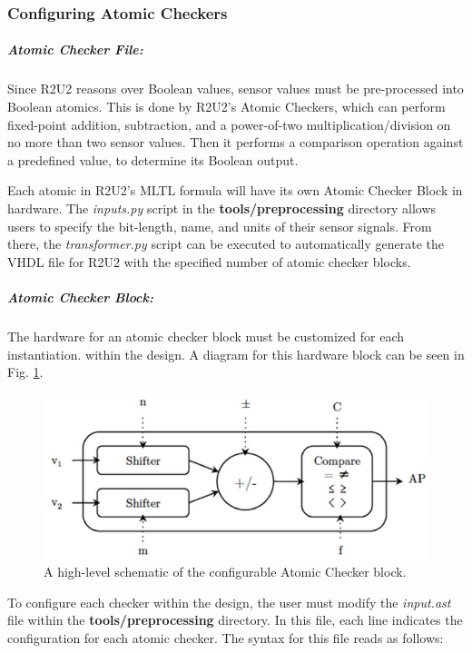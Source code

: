 \subsubsection{Configuring Atomic Checkers}
\label{ConfigAC}

\subparagraph{Atomic Checker File:}
Since R2U2 reasons over Boolean values, sensor values must be pre-processed into Boolean atomics. This is done by R2U2's Atomic Checkers, which can perform fixed-point addition, subtraction, and a power-of-two multiplication/division on no more than two sensor values. Then it performs a comparison operation against a predefined value, to determine its Boolean output.

Each atomic in R2U2's MLTL formula will have its own Atomic Checker Block in hardware. The \textit{inputs.py} script in the \textbf{tools/preprocessing} directory allows users to specify the bit-length, name, and units of their sensor signals. From there, the \textit{transformer.py} script can be executed to automatically generate the VHDL file for R2U2 with the specified number of atomic checker blocks.

\subparagraph{Atomic Checker Block:}
The hardware for an atomic checker block must be customized for each instantiation. within the design. A diagram for this hardware block can be seen in Fig. \ref{fig:ACB}.

\begin{figure}[H]
	\begin{center}
	\includegraphics[scale=0.5]{fig/AtomicCheckerBlock.pdf}
	\caption{A high-level schematic of the configurable Atomic Checker block.
	\label{fig:ACB}} 
	\end{center}
\end{figure}

To configure each checker within the design, the user must modify the \textit{input.ast} file within the \textbf{tools/preprocessing} directory. In this file, each line indicates the configuration for each atomic checker. The syntax for this file reads as follows:

